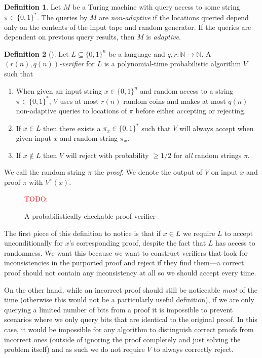 \documentclass[english,12pt]{reedthesis}
\theoremstyle{plain}
\theoremstyle{definition}
\newtheorem{defn}[defn]{Definition}
\theoremstyle{remark}
\newcommand{\TODO}[1]{\textcolor{red}{TODO: #1}}
\begin{document}
\begin{defn}\label{def:adaptive}
  Let $M$ be a Turing machine with query access to some string
  $\pi \in \{0, 1\}^{*}$. The queries by $M$ are \emph{non-adaptive} if the
  locations queried depend only on the contents of the input tape and random
  generator. If the queries are dependent on previous query results, then $M$ is
  \emph{adaptive}.
\end{defn}

\begin{defn}[{\cite[Def.\ 18.1]{AB09}}]\label{def:prob-check}
  Let $L \subseteq \{0, 1\}^{n}$ be a language and $q, r: \mathbb{N} \rightarrow \mathbb{N}$. A
  \emph{$(r(n), q(n))$-verifier} for $L$ is a polynomial-time probabilistic
  algorithm $V$ such that
  \begin{enumerate}
    \item When given an input string $x \in \{0, 1\}^{n}$ and random access to a
          string $\pi \in \{0, 1\}^{*}$, $V$ uses at most $r(n)$ random coins and
          makes at most $q(n)$ non-adaptive queries to locations of $\pi$ before
          either accepting or rejecting.
    \item If $x \in L$ then there exists a $\pi_{x} \in \{0, 1\}^{*}$ such that $V$
          will always accept when given input $x$ and random string $\pi_{x}$.
    \item If $x \notin L$ then $V$ will reject with probability $\ge 1/2$ for
          \emph{all} random strings $\pi$.
  \end{enumerate}
  We call the random string $\pi$ the \emph{proof}. We denote the output of $V$ on
  input $x$ and proof $\pi$ with $V^{\pi}(x)$.
\end{defn}

\begin{figure}
  \TODO{}
  \caption{A probabilistically-checkable proof verifier}\label{fig:pcp}
\end{figure}

The first piece of this definition to notice is that if $x \in L$ we require $L$
to accept unconditionally for $x$'s corresponding proof, despite the fact that
$L$ has access to randomness. We want this because we want to construct
verifiers that look for inconsistencies in the purported proof and reject if
they find them---a correct proof should not contain any inconsistency at all so we
should accept every time.

On the other hand, while an incorrect proof should still be noticeable
\emph{most} of the time (otherwise this would not be a particularly useful
definition), if we are only querying a limited number of bits from a proof it is
impossible to prevent scenarios where we only query bits that are identical to
the original proof. In this case, it would be impossible for any algorithm to
distinguish correct proofs from incorrect ones (outside of ignoring the proof
completely and just solving the problem itself) and as such we do not require
$V$ to always correctly reject.
\end{document}

